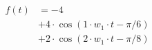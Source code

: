 \begin{center}
\begin{align*}
f(t) &= -4 \\
&+ 4 \cdot \cos( 1 \cdot w_1 \cdot t -\pi/6 ) \\
&+ 2 \cdot \cos( 2 \cdot w_1 \cdot t -\pi/8)
\end{align*}
\end{center}
